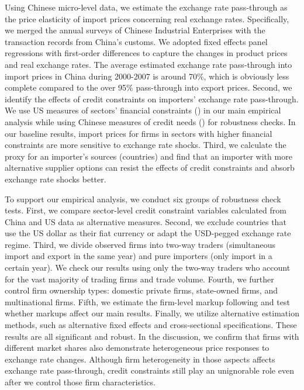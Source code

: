 \documentclass[12pt]{article}
\begin{document}
Using Chinese micro-level data, we estimate the exchange rate pass-through as the price elasticity of import prices concerning real exchange rates. Specifically, we merged the annual surveys of Chinese Industrial Enterprises with the transaction records from China’s customs. We adopted fixed effects panel regressions with first-order differences to capture the changes in product prices and real exchange rates. The average estimated exchange rate pass-through into import prices in China during 2000-2007 is around 70\%, which is obviously less complete compared to the over 95\% pass-through into export prices. Second, we identify the effects of credit constraints on importers' exchange rate pass-through. We use US measures of sectors’ financial constraints (\cite{manova-wei-zhang2015}) in our main empirical analysis while using Chinese measures of credit needs (\cite{fan-li-yeaple2015}) for robustness checks. In our baseline results, import prices for firms in sectors with higher financial constraints are more sensitive to exchange rate shocks. Third, we calculate the proxy for an importer's sources (countries) and find that an importer with more alternative supplier options can resist the effects of credit constraints and absorb exchange rate shocks better.

To support our empirical analysis, we conduct six groups of robustness check tests. First, we compare sector-level credit constraint variables calculated from China and US data as alternative measures. Second, we exclude countries that use the US dollar as their fiat currency or adapt the USD-pegged exchange rate regime. Third, we divide observed firms into two-way traders (simultaneous import and export in the same year) and pure importers (only import in a certain year). We check our results using only the two-way traders who account for the vast majority of trading firms and trade volume. Fourth, we further control firm ownership types: domestic private firms, state-owned firms, and multinational firms. Fifth, we estimate the firm-level markup following \cite{dlw2012} and test whether markups affect our main results. Finally, we utilize alternative estimation methods, such as alternative fixed effects and cross-sectional specifications. These results are all significant and robust. In the discussion, we confirm that firms with different market shares also demonstrate heterogeneous price responses to exchange rate changes. Although firm heterogeneity in those aspects affects exchange rate pass-through, credit constraints still play an unignorable role even after we control those firm characteristics. 
\end{document}
